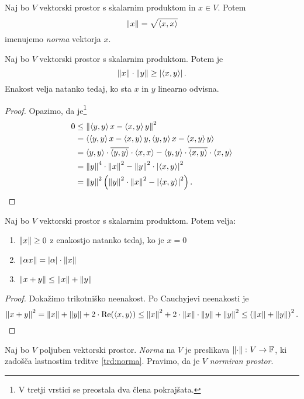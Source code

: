 \documentclass[12pt, a4paper]{article}
\begin{document}
\begin{definicija}
Naj bo $V$ vektorski prostor s skalarnim produktom in $x\in V$. Potem
\[
\norm{x}=\sqrt{\skl{x,x}}
\]
imenujemo \emph{norma} vektorja $x$.
\end{definicija}

\begin{izrek}
Naj bo $V$ vektorski prostor s skalarnim produktom. Potem je
\[
\norm{x}\cdot\norm{y}\geq\abs{\skl{x,y}}.
\]
Enakost velja natanko tedaj, ko sta $x$ in $y$ linearno odvisna.
\end{izrek}

\begin{proof}
Opazimo, da je\footnote{V tretji vrstici se preostala dva člena pokrajšata.}
\begin{align*}
0&\leq\norm{\skl{y,y}x-\skl{x,y}y}^2
\\
&=\skl{\skl{y,y}x-\skl{x,y}y,\skl{y,y}x-\skl{x,y}y}
\\
&=\skl{y,y}\cdot\overline{\skl{y,y}}\cdot\skl{x,x}-\skl{y,y}\cdot\overline{\skl{x,y}}\cdot\skl{x,y}
\\
&=\norm{y}^4\cdot\norm{x}^2-\norm{y}^2\cdot\abs{\skl{x,y}}^2
\\
&=\norm{y}^2\left(\norm{y}^2\cdot\norm{x}^2-\abs{\skl{x,y}}^2\right).\qedhere
\end{align*}
\end{proof}

\begin{trditev}\label{trd:norma}
Naj bo $V$ vektorski prostor s skalarnim produktom. Potem velja:

\begin{enumerate}[label=\alph*)]
\item $\norm{x}\geq 0$ z enakostjo natanko tedaj, ko je $x=0$
\item $\norm{\alpha x}=\abs{\alpha}\cdot\norm{x}$
\item $\norm{x+y}\leq\norm{x}+\norm{y}$
\end{enumerate}
\end{trditev}

\begin{proof}
Dokažimo trikotniško neenakost. Po Cauchyjevi neenakosti je
\[
\norm{x+y}^2=\norm{x}+\norm{y}+2\cdot\Re(\skl{x,y})\leq\norm{x}^2+2\cdot\norm{x}\cdot\norm{y}+\norm{y}^2\leq\left(\norm{x}+\norm{y}\right)^2.\qedhere
\]
\end{proof}

\begin{definicija}
Naj bo $V$ poljuben vektorski prostor. \emph{Norma} na $V$ je preslikava $\norm{\cdot}\colon V\to\F$, ki zadošča lastnostim trditve \ref{trd:norma}. Pravimo, da je $V$ \emph{normiran prostor}.
\end{definicija}
\end{document}
